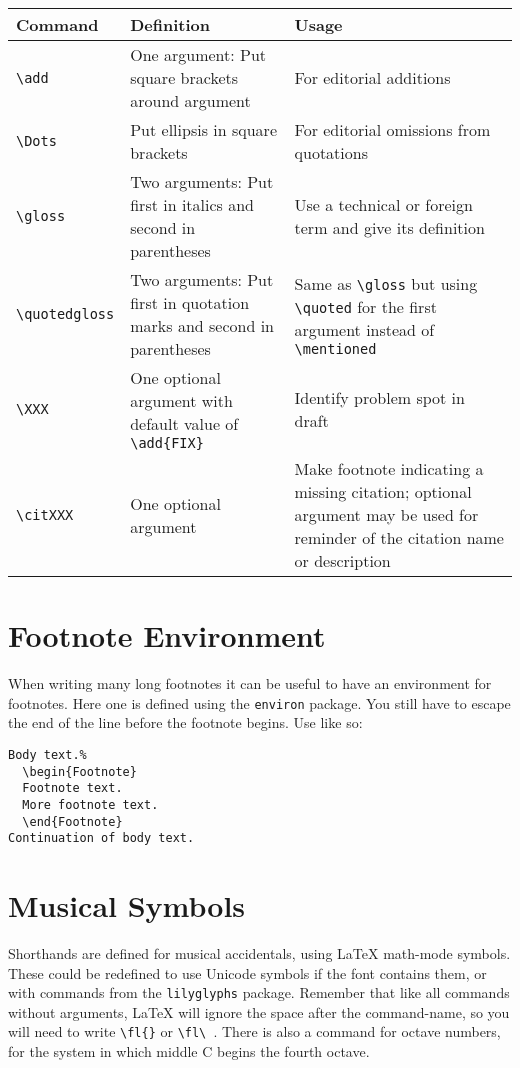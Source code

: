 \documentclass{article}
\begin{document}
\begin{center}
\begin{tabularx}{\linewidth}{lXX}
\toprule
Command & Definition & Usage\\
\midrule
\verb|\add| & One argument: Put square brackets around argument & For editorial additions\\
\verb|\Dots| & Put ellipsis in square brackets & For editorial omissions from quotations\\
\verb|\gloss| & Two arguments: Put first in italics and second in parentheses & Use a technical or foreign term and give its definition\\
\verb|\quotedgloss| & Two arguments: Put first in quotation marks and second in parentheses & Same as \verb|\gloss| but using \verb|\quoted| for the first argument instead of \verb|\mentioned|\\
\verb|\XXX| & One optional argument with default value of \verb|\add{FIX}| & Identify problem spot in draft\\
\verb|\citXXX| & One optional argument & Make footnote indicating a missing citation; optional argument may be used for reminder of the citation name or description\\
\bottomrule
\end{tabularx}
\end{center}

\section{Footnote Environment}

When writing many long footnotes it can be useful to have an environment for footnotes.
Here one is defined using the \texttt{environ} package.
You still have to escape the end of the line before the footnote begins.
Use like so:

\begin{verbatim}
Body text.%
  \begin{Footnote}
  Footnote text.
  More footnote text.
  \end{Footnote}
Continuation of body text.
\end{verbatim}

\section{Musical Symbols}

Shorthands are defined for musical accidentals, using \LaTeX{} math-mode symbols. 
These could be redefined to use Unicode symbols if the font contains them, or with commands from the \texttt{lilyglyphs} package.
Remember that like all commands without arguments, \LaTeX{} will ignore the space after the command-name, so you will need to write \verb|\fl{}| or \verb|\fl\ |.
There is also a command for octave numbers, for the system in which middle C begins the fourth octave.
\end{document}

